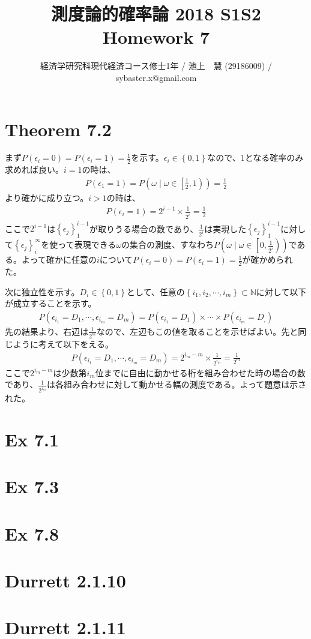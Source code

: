 \documentclass{article}
\begin{document}
\title{測度論的確率論 2018 S1S2 \\ 
Homework 7}
\author{経済学研究科現代経済コース修士1年 / 池上　慧 (29186009) / sybaster.x@gmail.com}
\maketitle

\section{Theorem 7.2}
まず$P(\epsilon_i = 0) = P(\epsilon_i = 1) = \frac{1}{2}$を示す。$\epsilon_i \in \left\{ 0,1\right\}$なので、$1$となる確率のみ求めれば良い。$i = 1$の時は、
\begin{align*}
	P(\epsilon_1 = 1) = P\left(\omega \mid \omega \in \left[\frac{1}{2}, 1\right)\right) = \frac{1}{2}
\end{align*}
より確かに成り立つ。$i > 1$の時は、
\begin{align*}
	P(\epsilon_i = 1) = 2^{i-1} \times \frac{1}{2^i} = \frac{1}{2}
\end{align*}
ここで$2^{i-1}$は$\left\{ \epsilon_j \right\}_1^{i-1}$が取りうる場合の数であり、$\frac{1}{2^i}$は実現した$\left\{ \epsilon_j \right\}_1^{i-1}$に対して$\left\{ \epsilon_j \right\}_i^{\infty}$を使って表現できる$\omega$の集合の測度、すなわち$P\left(\omega \mid \omega \in \left[0, \frac{1}{2^i}\right) \right)$である。よって確かに任意の$i$について$P(\epsilon_i = 0) = P(\epsilon_i = 1) = \frac{1}{2}$が確かめられた。

次に独立性を示す。$D_i \in \left\{ 0,1\right\}$として、任意の$\left\{ i_1, i_2, \cdots, i_m \right\} \subset \mathbb{N}$に対して以下が成立することを示す。
\begin{align*}
	P\left( \epsilon_{i_1} = D_1, \cdots, \epsilon_{i_m} = D_m \right) = P\left( \epsilon_{i_1} = D_1\right) \times \cdots \times P\left( \epsilon_{i_m} = D_,\right)
\end{align*}
先の結果より、右辺は$\frac{1}{2^m}$なので、左辺もこの値を取ることを示せばよい。先と同じように考えて以下をえる。
\begin{align*}
	P\left( \epsilon_{i_1} = D_1, \cdots, \epsilon_{i_m} = D_m \right) = 2^{i_m - m} \times \frac{1}{2^{i_m}} = \frac{1}{2^m}
\end{align*}
ここで$2^{i_m - m}$は少数第$i_m$位までに自由に動かせる桁を組み合わせた時の場合の数であり、$\frac{1}{2^{i_m}}$は各組み合わせに対して動かせる幅の測度である。よって題意は示された。


\section{Ex 7.1}

\section{Ex 7.3}

\section{Ex 7.8}

\section{Durrett 2.1.10}

\section{Durrett 2.1.11}
\end{document}
